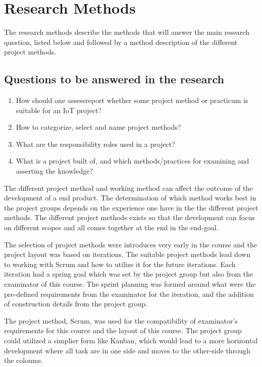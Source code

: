 \section{Research Methods}


The research methods describe the methods that will answer the main research question, listed below and followed by a method description of the different project methods.


\subsection{Questions to be answered in the research}

\begin{enumerate}
    \item{How should one assess\/report whether some project method or practicum is suitable for an IoT project?}
    \item{How to categorize, select and name project methods?}
    \item{What are the responsibility roles used in a project?}
    \item{What is a project built of, and which methods/practices for examining and asserting the knowledge?}
\end{enumerate}


The different project method and working method can affect the outcome of the development of a end product.
The determination of which method works best in the project groups depends on the experience one have in the the different project methods. 
The different project methods exists so that the development can focus on different scopes and all comes together at the end in the end-goal.

The selection of project methods were introduces very early in the course and the project layout was based on iterations.
The suitable project methods lead down to working with Scrum\cite{atlassianScrum} and how to utilize it for the future iterations. 
Each iteration had a spring goal which was set by the project group but also from the examinator of this course. 
The sprint planning was formed around what were the pre-defined requirements from the examinator for the iteration, and the addition of construction details from the project group.

The project method, Scrum, was used for the compatibility of examinator's requirements for this cource and the layout of this course.
The project group could utilized a simplier form like Kanban\cite{atlassianKanban}, which would lead to a more horizontal development where all task are in one side and moves to the other-side through the coloums.


